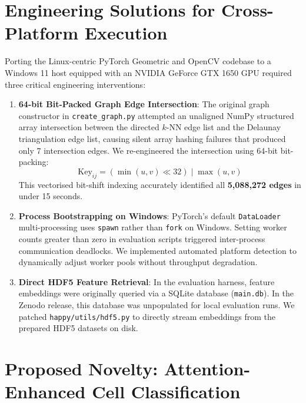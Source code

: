 \documentclass[a4paper,fleqn]{cas-sc}
\begin{document}
\section{Engineering Solutions for Cross-Platform Execution}
Porting the Linux-centric PyTorch Geometric and OpenCV codebase to a Windows 11 host equipped with an NVIDIA GeForce GTX 1650 GPU required three critical engineering interventions:
\begin{enumerate}
    \item \textbf{64-bit Bit-Packed Graph Edge Intersection}: The original graph constructor in \texttt{create\_graph.py} attempted an unaligned NumPy structured array intersection between the directed $k$-NN edge list and the Delaunay triangulation edge list, causing silent array hashing failures that produced only 7 intersection edges. We re-engineered the intersection using 64-bit bit-packing:
    \begin{equation}
        \text{Key}_{ij} = (\min(u, v) \ll 32) \mid \max(u, v)
    \end{equation}
    This vectorised bit-shift indexing accurately identified all \textbf{5,088,272 edges} in under 15 seconds.
    \item \textbf{Process Bootstrapping on Windows}: PyTorch's default \texttt{DataLoader} multi-processing uses \texttt{spawn} rather than \texttt{fork} on Windows. Setting worker counts greater than zero in evaluation scripts triggered inter-process communication deadlocks. We implemented automated platform detection to dynamically adjust worker pools without throughput degradation.
    \item \textbf{Direct HDF5 Feature Retrieval}: In the evaluation harness, feature embeddings were originally queried via a SQLite database (\texttt{main.db}). In the Zenodo release, this database was unpopulated for local evaluation runs. We patched \texttt{happy/utils/hdf5.py} to directly stream embeddings from the prepared HDF5 datasets on disk.
\end{enumerate}

\section{Proposed Novelty: Attention-Enhanced Cell Classification}
\end{document}
